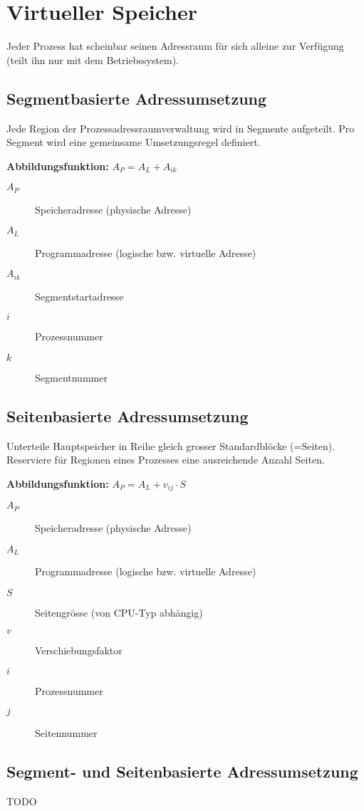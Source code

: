\section{Virtueller Speicher}

Jeder Prozess hat scheinbar seinen Adressraum für sich alleine zur Verfügung
(teilt ihn nur mit dem Betriebssystem).

\subsection{Segmentbasierte Adressumsetzung}

Jede Region der Prozessadressraumverwaltung wird in Segmente aufgeteilt. Pro
Segment wird eine gemeinsame Umsetzungsregel definiert.

\textbf{Abbildungsfunktion:} $A_P = A_L + A_{ik}$

\begin{description}
	\item[$A_P$] Speicheradresse (physische Adresse)
	\item[$A_L$] Programmadresse (logische bzw. virtuelle Adresse)
	\item[$A_{ik}$] Segmentstartadresse
	\item[$i$] Prozessnummer
	\item[$k$] Segmentnummer
\end{description}

\subsection{Seitenbasierte Adressumsetzung}

Unterteile Hauptspeicher in Reihe gleich grosser Standardblöcke (=Seiten).
Reserviere für Regionen eines Prozesses eine ausreichende Anzahl Seiten.

\textbf{Abbildungsfunktion:} $A_P = A_L + v_{ij} \cdot S$

\begin{description}
	\item[$A_P$] Speicheradresse (physische Adresse)
	\item[$A_L$] Programmadresse (logische bzw. virtuelle Adresse)
	\item[$S$] Seitengrösse (von CPU-Typ abhängig)
	\item[$v$] Verschiebungsfaktor
	\item[$i$] Prozessnummer
	\item[$j$] Seitennummer
\end{description}

\subsection{Segment- und Seitenbasierte Adressumsetzung}

TODO
